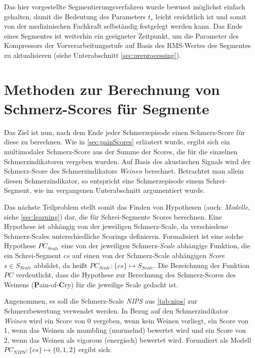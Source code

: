 Das hier vorgestellte Segmentierungsverfahren wurde bewusst möglichst einfach gehalten, damit die Bedeutung des Parameters $t_{s}$ leicht ersichtlich ist und somit von der medizinischen Fachkraft selbständig festgelegt werden kann. Das Ende eines Segmentes ist weiterhin ein geeigneter Zeitpunkt, um die Parameter des Kompressors der Vorverarbeitungsstufe auf Basis des RMS-Wertes des Segmentes zu aktualisieren (siehe Unterabschnitt  \ref{sec:preprocessing}).


\section{Methoden zur Berechnung von Schmerz-Scores für Segmente}
\label{sec:overviewPainRegression}

Das Ziel ist nun, nach dem Ende jeder Schmerzepisode einen Schmerz-Score für diese zu berechnen. Wie in \autoref{sec:painScores} erläutert wurde, ergibt sich ein multimodaler Schmerz-Score aus der Summe der Scores, die für die einzelnen Schmerzindikatoren vergeben wurden. Auf Basis des akustischen Signals wird der Schmerz-Score des Schmerzindikators \emph{Weinen} berechnet. Betrachtet man allein diesen Schmerzindikator, so entspricht eine Schmerzepisode einem Schrei-Segment, wie im vergangenen Unterabschnitt argumentiert wurde.

Das nächste Teilproblem stellt somit das Finden von Hypothesen (auch: \emph{Modelle}, siehe \autoref{sec:learning}) dar, die für Schrei-Segmente Scores berechnen. Eine Hypothese ist abhängig von der jeweiligen Schmerz-Scale, da verschiedene Schmerz-Scales unterschiedliche Scorings definieren. Formalisiert ist eine solche Hypothese $PC_{Scale}$ eine von der jeweiligen Schmerz-\emph{Scale} abhängige Funktion, die ein Schrei-Segment $cs$ auf einen von der Schmerz-Scale abhängigen \emph{Score} $s \in S_{Scale}$ abbildet, da heißt $PC_{Scale}: \{cs\} \mapsto S_{Scale}$. Die Bezeichnung der Funktion $PC$ verdeutlicht, dass die Hypothese zur Berechnung des Schmerz-Scores des Weinens (\textbf{P}ain-of-\textbf{C}ry) für die jeweilige Scale gedacht ist.

Angenommen, es soll die Schmerz-Scale \emph{NIPS} aus \autoref{tab:nips} zur Schmerzbewertung verwendet werden. In Bezug auf den Schmerzindikator \emph{Weinen} wird ein Score von 0 vergeben, wenn kein Weinen vorliegt, ein Score von 1, wenn das Weinen als \glqq mumbling\grqq{} (murmelnd) bewertet wird und ein Score von 2, wenn das Weinen als \glqq vigorous\grqq{} (energisch) bewertet wird. Formuliert als Modell $PC_{NIPS}:\{cs\} \mapsto \{0, 1 , 2\}$ ergibt sich:


